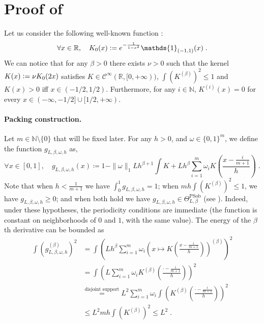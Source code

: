 \documentclass[10pt]{article} %
\def\Ind{\mathds{1}}
\newcommand{\R}[0]{\mathbb{R}}
\newcommand{\N}[0]{\mathbb{N}}
\newcommand{\eqdef}{\vcentcolon=}
\newcommand\p[1]{\left( {#1}\right)}
\newcommand\RG[1]{\textcolor{red}{#1}}
\newcommand\mRG[1]{\marginpar{\tiny\RG{#1}}}
\begin{document}
\section{Proof of  }
\label{proofofth:sidp}

Let us consider the following well-known function :
\begin{equation*}
    \forall x \in \R, \quad K_0(x) \eqdef e^{- \frac{1}{1 - x^2}}\Ind_{(-1, 1)}(x) \;.
\end{equation*}
We can notice that for any $\beta>0$ there exists $\nu > 0$ such that the kernel $K(x) \eqdef \nu K_0(2x)$ satisfies $K \in \mathcal{C}^{\infty}(\R, [0, +\infty))$, $\int \p{K^{(\beta)}}^2 \leq 1$  %
and $K(x)>0$ iff $x \in (-1/2, 1/2)$. Furthermore, for any $i \in \N$, $K^{(i)}(x) = 0$ for every $x \in (-\infty, -1/2] \cup [1/2, +\infty)$.

\paragraph{Packing construction.}
Let $m \in \N \setminus \{0\}$ that will be fixed later. For any $h > 0$, and $\omega \in \{0, 1\}^m$, we define the function $g_{L, \beta, \omega, h}$ as,
 \begin{equation}
 \label{eq:defgkernel}
     \forall x \in [0, 1],
     \quad 
     g_{L, \beta, \omega, h}(x) \coloneqq 1 - \| \omega \|_1 L h^{\beta+1} \int K + L h^{\beta} \sum_{i=1}^m \omega_i K\p{\frac{x - \frac{i}{m+1}}{h}} \;.
\end{equation}
Note that when $h < \frac{1}{m+1}$ we have $\int_0^1 g_{L,\beta,\omega,h} =1$; when $m h \int \p{K^{(\beta)}}^2 \leq 1$, we have $g_{L,\beta,\omega,h} \geq 0$; and when both hold we have $g_{L, \beta, \omega, h} \in \Theta^{\text{PSob}}_{L, \beta}$ (see ). %
Indeed, under these hypotheses, the periodicity conditions are immediate (the function is constant on neighborhoods of $0$ and $1$, with the same value). The energy of the $\beta$th derivative can be bounded as
\begin{equation*}
\begin{aligned}
    \int \p{g_{L, \beta, \omega, h}^{(\beta)}}^2
    &= \int \p{L h^{\beta} \sum_{i=1}^m \omega_i \p{x \mapsto K\p{ \frac{x - \frac{i}{m+1}}{h}}}^{(\beta)}}^2 \\
    &= \int \p{L\sum_{i=1}^m \omega_i K^{(\beta)}\p{ \frac{\cdot - \frac{i}{m+1}}{h}}}^2 \\
    &\stackrel{\text{disjoint support}}{=} L^2 \sum_{i=1}^m \omega_i\int  \p{K^{(\beta)}\p{ \frac{\cdot - \frac{i}{m+1}}{h}}}^2 \\
    &\leq L^2 m h \int \p{K^{(\beta)}}^2 \leq L^2 \;.
\end{aligned}
\end{equation*}
\end{document}

